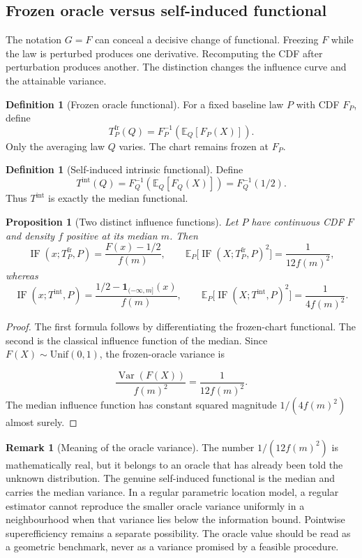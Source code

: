\documentclass[11pt,a4paper]{article}
\newtheorem{proposition}[theorem]{Proposition}
\theoremstyle{definition}
\newtheorem{definition}[theorem]{Definition}
\newtheorem{remark}[theorem]{Remark}
\newcommand{\E}{\mathbb{E}}
\newcommand{\Var}{\operatorname{Var}}
\newcommand{\IF}{\operatorname{IF}}
\begin{document}
\subsection{Frozen oracle versus self-induced functional}

The notation $G=F$ can conceal a decisive change of functional. Freezing $F$ while the law is perturbed produces one derivative. Recomputing the CDF after perturbation produces another. The distinction changes the influence curve and the attainable variance.

\begin{definition}[Frozen oracle functional]
For a fixed baseline law $P$ with CDF $F_P$, define
\[
T_P^{\mathrm{fr}}(Q)
=
F_P^{-1}\!\left(\E_Q[F_P(X)]\right).
\]
Only the averaging law $Q$ varies. The chart remains frozen at $F_P$.
\end{definition}

\begin{definition}[Self-induced intrinsic functional]
Define
\[
T^{\mathrm{int}}(Q)
=
F_Q^{-1}\!\left(\E_Q[F_Q(X)]\right)
=
F_Q^{-1}(1/2).
\]
Thus $T^{\mathrm{int}}$ is exactly the median functional.
\end{definition}

\begin{proposition}[Two distinct influence functions]\label{prop:oracle-self-if}
Let $P$ have continuous CDF $F$ and density $f$ positive at its median $m$. Then
\[
\IF(x;T_P^{\mathrm{fr}},P)
=
\frac{F(x)-1/2}{f(m)},
\qquad
\E_P\bigl[\IF(X;T_P^{\mathrm{fr}},P)^2\bigr]
=
\frac1{12f(m)^2},
\]
whereas
\[
\IF(x;T^{\mathrm{int}},P)
=
\frac{1/2-\mathbf 1_{(-\infty,m]}(x)}{f(m)},
\qquad
\E_P\bigl[\IF(X;T^{\mathrm{int}},P)^2\bigr]
=
\frac1{4f(m)^2}.
\]
\end{proposition}

\begin{proof}
The first formula follows by differentiating the frozen-chart functional. The second is the classical influence function of the median. Since $F(X)\sim\mathrm{Unif}(0,1)$, the frozen-oracle variance is\par\smallskip
\[
\frac{\Var(F(X))}{f(m)^2}=\frac1{12f(m)^2}.
\]
The median influence function has constant squared magnitude $1/(4f(m)^2)$ almost surely.
\end{proof}

\begin{remark}[Meaning of the oracle variance]
The number $1/(12f(m)^2)$ is mathematically real, but it belongs to an oracle that has already been told the unknown distribution. The genuine self-induced functional is the median and carries the median variance. In a regular parametric location model, a regular estimator cannot reproduce the smaller oracle variance uniformly in a neighbourhood when that variance lies below the information bound. Pointwise superefficiency remains a separate possibility. The oracle value should be read as a geometric benchmark, never as a variance promised by a feasible procedure.
\end{remark}
\end{document}
